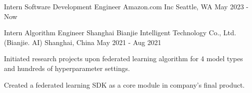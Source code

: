 

\begin{cventries}

  \cventry
    {Intern Software Development Engineer} %
    {Amazon.com Inc} %
    {Seattle, WA} %
    {May 2023 - Now} %
    {
    }
  
  \cventry
    {Intern Algorithm Engineer} %
    {Shanghai Bianjie Intelligent Technology Co., Ltd. (Bianjie. AI)} %
    {Shanghai, China} %
    {May 2021 - Aug 2021} %
    {
      \begin{cvitems} %
        \item {Initiated research projects upon federated learning algorithm for 4 model types and hundreds of hyperparameter settings.}
        \item {Created a federated learning SDK as a core module in company's final product.}
      \end{cvitems}
    }

\end{cventries}
